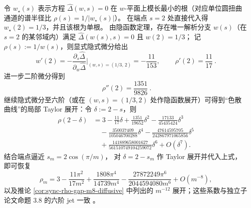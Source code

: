 \begin{remark}[端点导数指纹：\texorpdfstring{$\rho'(2)=11/17$}{rho'(2)=11/17}]\label{rem:sync-rho-derivative-fingerprint}
令 \(w_\star(s)\) 表示方程 \(\widehat\Delta(w,s)=0\) 在 \(w\)-平面上模长最小的根（对应单位圆扭曲通道的谱半径比 \(\rho(s)=1/|w_\star(s)|\)）。
在端点 \(s=2\) 处直接代入得 \(w_\star(2)=1/3\)，并且该根为单根。
由隐函数定理，存在唯一解析分支 \(w(s)\)（在 \(s=2\) 的某邻域内）满足
\(\widehat\Delta(w(s),s)=0\) 且 \(w(2)=1/3\)；
记 \(\rho(s):=1/w(s)\)，则显式隐式微分给出
\[
w'(2)=-\frac{\partial_s\widehat\Delta}{\partial_w\widehat\Delta}\Big|_{(w,s)=(1/3,\,2)}=-\frac{11}{153},
\qquad
\boxed{\ \rho'(2)=\frac{11}{17}\ }.
\]
进一步二阶微分得到
\[
\boxed{\ \rho''(2)=\frac{1351}{9826}\ }.
\]
继续隐式微分至六阶（或在 \((w,s)=(1/3,2)\) 处作隐函数展开）可得到“色散曲线”的局部 Taylor 展开：令 \(\delta:=2-s\)，则
\[
\boxed{\;
\begin{aligned}
\rho(2-\delta)
&=3-\frac{11}{17}\delta+\frac{1351}{19652}\delta^2
-\frac{17133}{45435424}\delta^3\\
&\quad
-\frac{350037409}{105046700288}\delta^4
-\frac{47614595705}{242867971065856}\delta^5\\
&\quad
+\frac{141889658001627}{561510749104259072}\delta^6
+O(\delta^7).
\end{aligned}\;}
\]
结合端点逼近 \(s_m=2\cos(\pi/m)\)，
对 \(\delta=2-s_m\) 作 Taylor 展开并代入上式，即可恢复
\[
\rho_m
=3-\frac{11\pi^2}{17m^2}
+\frac{1808\pi^4}{14739m^4}
-\frac{27872249\pi^6}{2044594080m^6}
+O(m^{-8}),
\]
以及推论 \ref{cor:sync-rho-gap-m8-diffusive} 中列出的 \(m^{-12}\) 展开；这些系数与独立子论文命题 3.8 的六阶 jet 一致
\cite{Internal2026SelfDualSynchronisationKernelCyclotomicTwists}。
\end{remark}

